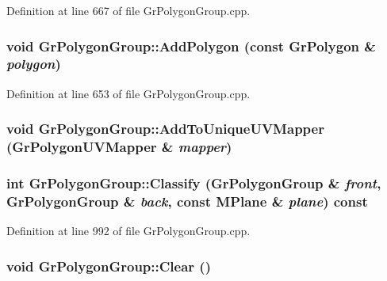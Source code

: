 Definition at line 667 of file GrPolygonGroup.cpp.\hypertarget{class_gr_polygon_group_2f06fcddd6fd04a28b8ae8682a36d508}{
\subsubsection[{AddPolygon}]{\setlength{\rightskip}{0pt plus 5cm}void GrPolygonGroup::AddPolygon (const {\bf GrPolygon} \& {\em polygon})}}
\label{class_gr_polygon_group_2f06fcddd6fd04a28b8ae8682a36d508}




Definition at line 653 of file GrPolygonGroup.cpp.\hypertarget{class_gr_polygon_group_364fa33e341e4462ccbb76061843ff4e}{
\subsubsection[{AddToUniqueUVMapper}]{\setlength{\rightskip}{0pt plus 5cm}void GrPolygonGroup::AddToUniqueUVMapper (GrPolygonUVMapper \& {\em mapper})}}
\label{class_gr_polygon_group_364fa33e341e4462ccbb76061843ff4e}


\hypertarget{class_gr_polygon_group_7e0719fa01ae4b03cd135fdc91ff4697}{
\subsubsection[{Classify}]{\setlength{\rightskip}{0pt plus 5cm}int GrPolygonGroup::Classify ({\bf GrPolygonGroup} \& {\em front}, \/  {\bf GrPolygonGroup} \& {\em back}, \/  const {\bf MPlane} \& {\em plane}) const}}
\label{class_gr_polygon_group_7e0719fa01ae4b03cd135fdc91ff4697}




Definition at line 992 of file GrPolygonGroup.cpp.\hypertarget{class_gr_polygon_group_a3bcc378c3f94203ec19e897361ae164}{
\subsubsection[{Clear}]{\setlength{\rightskip}{0pt plus 5cm}void GrPolygonGroup::Clear ()}}
\label{class_gr_polygon_group_a3bcc378c3f94203ec19e897361ae164}




